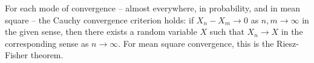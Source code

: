 For each mode of convergence -- almost everywhere, in probability, and in mean square -- the Cauchy convergence criterion holds: if $X_n - X_m \to 0$ as $n, m \to \infty$ in the given sense, then there exists a random variable $X$ such that $X_n \to X$ in the corresponding sense as $n \to \infty$. For mean square convergence, this is the Riesz-Fisher theorem.

